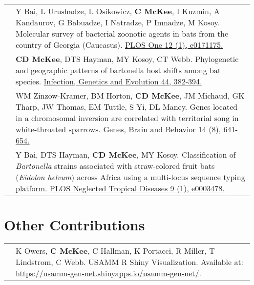 \documentclass[letterpaper]{deedy-resume} %
\begin{document}
\begin{tabular}{>{\raggedright\arraybackslash}p{2cm}p{16cm}}
2017 & Y Bai, L Urushadze, L Osikowicz, \textbf{C McKee}, I Kuzmin, A Kandaurov, G Babuadze, I Natradze, P Imnadze, M Kosoy. Molecular survey of bacterial zoonotic agents in bats from the country of Georgia (Caucasus). \href{https://doi.org/10.1371/journal.pone.0171175}{\textcolor{special}{PLOS One 12 (1), e0171175}.}\\

2016 & \textbf{CD McKee}, DTS Hayman, MY Kosoy, CT Webb. Phylogenetic and geographic patterns of bartonella host shifts among bat species. \href{https://doi.org/10.1016/j.meegid.2016.07.033}{\textcolor{special}{Infection, Genetics and Evolution 44, 382-394}.}\\

2015 & WM Zinzow-Kramer, BM Horton, \textbf{CD McKee}, JM Michaud, GK Tharp, JW Thomas, EM Tuttle, S Yi, DL Maney. Genes located in a chromosomal inversion are correlated with territorial song in white-throated sparrows. \href{https://doi.org/10.1111/gbb.12252}{\textcolor{special}{Genes, Brain and Behavior 14 (8), 641-654}.}\\

2015 & Y Bai, DTS Hayman, \textbf{CD McKee}, MY Kosoy. Classification of \textit{Bartonella} strains associated with straw-colored fruit bats (\textit{Eidolon helvum}) across Africa using a multi-locus sequence typing platform. \href{https://doi.org/10.1371/journal.pntd.0003478}{\textcolor{special}{PLOS Neglected Tropical Diseases 9 (1), e0003478}.}\\

\end{tabular}
\sectionspace


\section{Other Contributions}
\begin{tabular}{>{\raggedright\arraybackslash}p{2cm}p{16cm}}
2015 & K Owers, \textbf{C McKee}, C Hallman, K Portacci, R Miller, T Lindstrom, C Webb. USAMM R Shiny Visualization. Available at: \href{https://usamm-gen-net.shinyapps.io/usamm-gen-net/}{\textcolor{special}{https://usamm-gen-net.shinyapps.io/usamm-gen-net/}}.
\end{tabular}
\sectionspace

\end{document}
